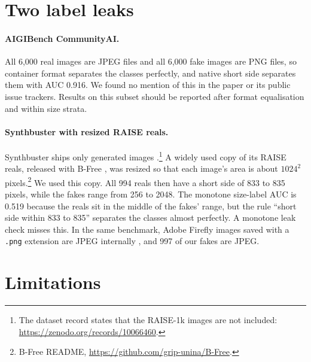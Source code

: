 \documentclass[letterpaper]{article} %
\begin{document}
\section{Two label leaks}
\label{sec:leaks}

\paragraph{AIGIBench CommunityAI.} All 6,000 real images are JPEG files and all
6,000 fake images are PNG files, so container format separates the classes
perfectly, and native short side separates them with AUC 0.916. We found no
mention of this in the paper or its public issue trackers. Results on this
subset should be reported after format equalisation and within size strata.

\paragraph{Synthbuster with resized RAISE reals.} Synthbuster ships only
generated images \cite{bammey2024synthbuster}.\footnote{The dataset record
states that the RAISE-1k images are not included:
\url{https://zenodo.org/records/10066460}.} A widely used copy of its RAISE
reals, released with B-Free \cite{guillaro2025bfree}, was resized so that
each image's area is about $1024^2$ pixels.\footnote{B-Free README,
\url{https://github.com/grip-unina/B-Free}.} We used this copy. All 994 reals
then have a short side of 833 to 835 pixels, while the fakes range from 256
to 2048. The monotone size-label AUC is 0.519 because the reals sit in the
middle of the fakes' range, but the rule ``short side within 833 to 835''
separates the classes almost perfectly. A monotone leak check misses this. In
the same benchmark, Adobe Firefly images saved with a \texttt{.png} extension
are JPEG internally \cite{ricker2026biasid}, and 997 of our fakes are JPEG.

\section{Limitations}
\end{document}
